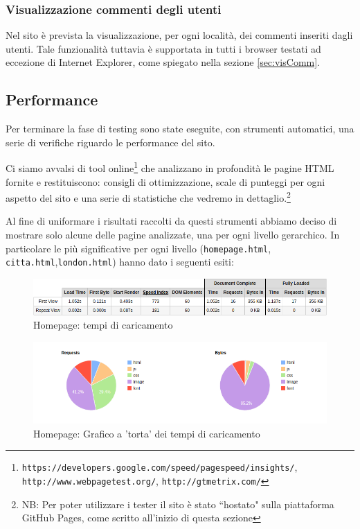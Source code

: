 \subsubsection{Visualizzazione commenti degli utenti}
Nel sito è prevista la visualizzazione, per ogni località, dei commenti inseriti dagli utenti.
Tale funzionalità tuttavia è supportata in tutti i browser testati ad eccezione di Internet Explorer, come spiegato nella sezione \ref{sec:visComm}.

\subsection{Performance}
Per terminare la fase di testing sono state eseguite, con strumenti
automatici, una serie di verifiche riguardo le performance del sito.

Ci siamo avvalsi di tool online\footnote{\texttt{https://developers.google.com/speed/pagespeed/insights/}, \texttt{http://www.webpagetest.org/},
\texttt{http://gtmetrix.com/}} che analizzano in profondità le pagine HTML
fornite e restituiscono: consigli di ottimizzazione, scale di punteggi per ogni
aspetto del sito e una serie di statistiche che vedremo in dettaglio.\footnote{NB: Per poter utilizzare i tester il sito è stato ``hostato" sulla piattaforma GitHub Pages, come scritto all'inizio di questa sezione}

Al fine di uniformare i risultati raccolti da questi strumenti abbiamo deciso
di mostrare solo alcune delle pagine analizzate, una per ogni livello
gerarchico.
In particolare le più significative per ogni livello (\texttt{homepage.html},
\texttt{citta.html},\texttt{london.html}) hanno dato i seguenti esiti:

\begin{figure}[h]
\includegraphics[width=\linewidth]{images/performance/webpagetest/home.png}
\caption{Homepage: tempi di caricamento}
\label{fig:tempiHome}
\end{figure}

\begin{figure}[h]
\includegraphics[width=\linewidth]{images/performance/webpagetest/home-graph.png}
\caption{Homepage: Grafico a 'torta' dei tempi di caricamento}
\end{figure}


